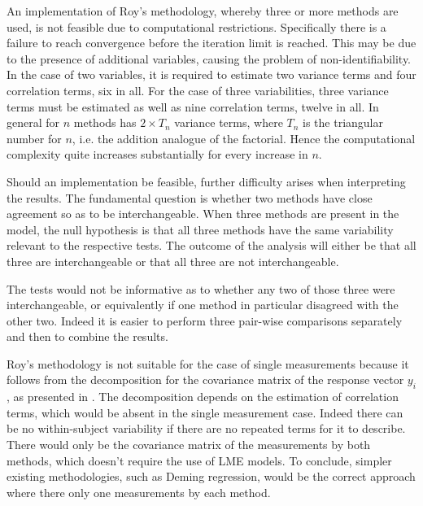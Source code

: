 \documentclass[12pt, a4paper]{report}
\theoremstyle{plain}
\theoremstyle{definition}
\theoremstyle{remark}
\begin{document}
An implementation of Roy's methodology, whereby three or more methods are used, is not feasible due to computational restrictions. Specifically there is a failure to reach convergence before the iteration limit is reached. This may be due to the presence of additional variables, causing the problem of non-identifiability. In the case of two variables, it is required to estimate two variance terms and four correlation terms, six in all. For the case of three variabilities, three variance terms must be estimated as well as nine correlation terms, twelve in all. In general for $n$ methods has $2 \times T_{n}$ variance terms, where $T_n$ is the triangular number for $n$, i.e. the addition analogue of the factorial. Hence the computational complexity quite increases substantially for every increase in $n$.

Should an implementation be feasible, further difficulty arises when interpreting the results. The fundamental question is whether two methods have close agreement so as to be interchangeable. When three methods are present in the model, the null hypothesis is that all three methods have the same variability relevant to the respective tests. The outcome of the analysis will either be that all three are interchangeable or that all three are not interchangeable.

The tests would not be informative as to whether any two of those three were interchangeable, or equivalently if one method in particular disagreed with the other two. Indeed it is easier to perform three pair-wise comparisons separately and then to combine the results.

Roy's methodology is not suitable for the case of single measurements because it follows from the decomposition for the covariance matrix of the response vector $y_{i}$, as presented in \citet{hamlett}. The decomposition depends on the estimation of correlation terms, which would be absent in the single measurement case. Indeed there can be no within-subject variability if there are no repeated terms for it to describe. There would only be the covariance matrix of the measurements by both methods, which doesn't require the use of LME models. To conclude, simpler existing methodologies, such as Deming regression, would be the correct approach where there only one measurements by each method.






	
	
	
	
\end{document}

